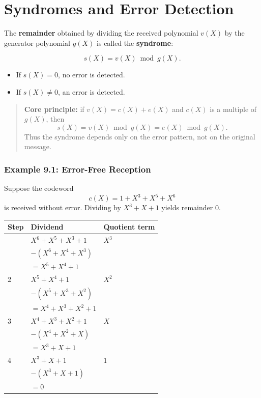 \documentclass[11pt,oneside]{book}
\providecommand{\tightlist}{\setlength{\itemsep}{0pt}\setlength{\parskip}{0pt}}
\theoremstyle{plain}
\theoremstyle{definition}
\theoremstyle{remark}
\begin{document}
\section{Syndromes and Error Detection}\label{sec:syndromes-and-error-detection}

The \textbf{remainder} obtained by dividing the received polynomial
\(v(X)\) by the generator polynomial \(g(X)\) is called the
\textbf{syndrome}:

\[s(X)=v(X) \bmod g(X).\]

\begin{itemize}
\tightlist
\item
  If \(s(X)=0\), no error is detected.
\item
  If \(s(X)\neq 0\), an error is detected.
\end{itemize}

\begin{quote}
\textbf{Core principle:} if \(v(X)=c(X)+e(X)\) and \(c(X)\) is a
multiple of \(g(X)\), then \[s(X)=v(X) \bmod g(X)=e(X) \bmod g(X).\]
Thus the syndrome depends only on the error pattern, not on the original
message.
\end{quote}

\subsubsection{Example 9.1: Error-Free
Reception}\label{example-9.1-error-free-reception}

Suppose the codeword \[c(X)=1+X^3+X^5+X^6\] is received without error.
Dividing by \(X^3+X+1\) yields remainder 0.

\begin{longtable}[]{@{}lll@{}}
\toprule\noalign{}
Step & Dividend & Quotient term \\
\midrule\noalign{}
\endhead
\bottomrule\noalign{}
\endlastfoot
1 & \(X^6 + X^5 + X^3 + 1\) & \(X^3\) \\
& \(-(X^6 + X^4 + X^3)\) & \\
& \(= X^5 + X^4 + 1\) & \\
2 & \(X^5 + X^4 + 1\) & \(X^2\) \\
& \(-(X^5 + X^3 + X^2)\) & \\
& \(= X^4 + X^3 + X^2 + 1\) & \\
3 & \(X^4 + X^3 + X^2 + 1\) & \(X\) \\
& \(-(X^4 + X^2 + X)\) & \\
& \(= X^3 + X + 1\) & \\
4 & \(X^3 + X + 1\) & \(1\) \\
& \(-(X^3 + X + 1)\) & \\
& \(= 0\) & \\
\end{longtable}
\end{document}
